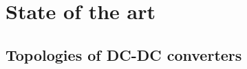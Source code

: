 \chapter{State of the art}\label{background}



\section{Topologies of DC-DC converters}\label{DC_DC_Converters}





